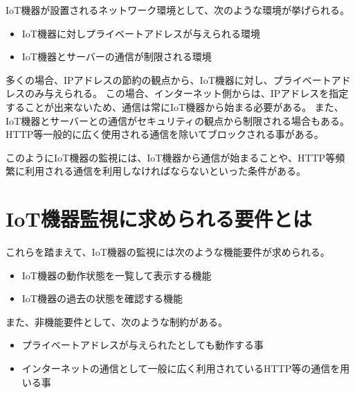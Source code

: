 IoT機器が設置されるネットワーク環境として、次のような環境が挙げられる。
\begin{itemize}
	\item IoT機器に対しプライベートアドレスが与えられる環境
	\item IoT機器とサーバーの通信が制限される環境
\end{itemize}

多くの場合、IPアドレスの節約の観点から、IoT機器に対し、プライベートアドレスのみ与えられる。
この場合、インターネット側からは、IPアドレスを指定することが出来ないため、通信は常にIoT機器から始まる必要がある。
また、IoT機器とサーバーとの通信がセキュリティの観点から制限される場合もある。
HTTP等一般的に広く使用される通信を除いてブロックされる事がある。
\medskip

このようにIoT機器の監視には、IoT機器から通信が始まることや、HTTP等頻繁に利用される通信を利用しなければならないといった条件がある。

\section{IoT機器監視に求められる要件とは}
これらを踏まえて、IoT機器の監視には次のような機能要件が求められる。
\begin{itemize}
	\item IoT機器の動作状態を一覧して表示する機能
	\item IoT機器の過去の状態を確認する機能
\end{itemize}
また、非機能要件として、次のような制約がある。
\begin{itemize}
	\item プライベートアドレスが与えられたとしても動作する事
	\item インターネットの通信として一般に広く利用されているHTTP等の通信を用いる事
\end{itemize}

